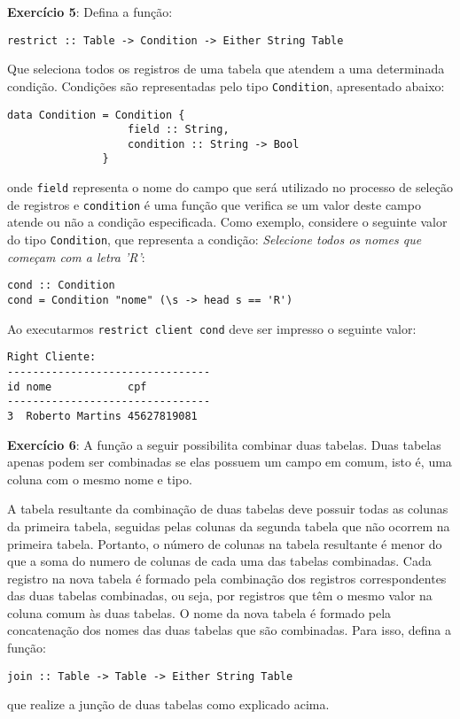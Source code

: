 \documentclass[11pt,a4paper]{report}
\begin{document}
\textbf{Exerc\'icio 5}: Defina a fun\c{c}\~ao:
\begin{center}
\texttt{restrict :: Table -> Condition -> Either String Table}
\end{center}
Que seleciona todos os registros de uma tabela que atendem a uma determinada condi\c{c}\~ao. Condi\c{c}\~oes s\~ao 
representadas pelo tipo \texttt{Condition}, apresentado abaixo:
\begin{verbatim}
data Condition = Condition {
                   field :: String,
                   condition :: String -> Bool
               }
\end{verbatim}
onde \texttt{field} representa o nome do campo que ser\'a utilizado no processo de sele\c{c}\~ao de registros e 
\texttt{condition} \'e uma fun\c{c}\~ao que verifica se um valor deste campo atende ou n\~ao a condi\c{c}\~ao
 especificada. Como exemplo, considere o seguinte valor do tipo \texttt{Condition}, que representa a condi\c{c}\~ao:
 \textit{Selecione todos os nomes que come\c{c}am com a letra 'R'}:
\begin{verbatim}
cond :: Condition
cond = Condition "nome" (\s -> head s == 'R')
\end{verbatim}

Ao executarmos \texttt{restrict client cond} deve ser impresso o seguinte valor:

\begin{verbatim}
Right Cliente:
--------------------------------
id nome            cpf         
--------------------------------
3  Roberto Martins 45627819081 
\end{verbatim}

\textbf{Exerc\'icio 6}: A fun\c{c}\~ao a seguir possibilita combinar duas tabelas. Duas tabelas apenas podem ser
combinadas se elas possuem um campo em comum, isto \'e, uma coluna com o mesmo nome e tipo.

A tabela resultante da combina\c{c}\~ao de duas tabelas deve possuir todas as colunas da primeira tabela, seguidas
pelas colunas da segunda tabela que n\~ao ocorrem na primeira tabela. Portanto, o n\'umero de colunas na tabela
resultante \'e menor do que a soma do numero de colunas de cada uma das tabelas combinadas.
Cada registro na nova tabela \'e formado pela combina\c{c}\~ao dos registros correspondentes das duas tabelas 
combinadas, ou seja, por registros que t\^em o mesmo valor na coluna comum \`as duas tabelas. O nome da nova tabela
\'e formado pela concatena\c{c}\~ao dos nomes das duas tabelas que s\~ao combinadas.
Para isso, defina a fun\c{c}\~ao:
\begin{center}
\texttt{join :: Table -> Table -> Either String Table}
\end{center}
que realize a jun\c{c}\~ao de duas tabelas como explicado acima.
\end{document}
